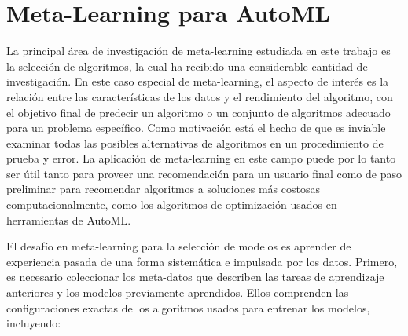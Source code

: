 %
%


\section{Meta-Learning para AutoML}\label{sec:metalearning-automl}


La principal área de investigación de meta-learning estudiada en este trabajo es la selección de algoritmos, la cual ha recibido una considerable cantidad de investigación. En este caso especial de meta-learning, el aspecto de interés es la relación entre las características de los datos y el rendimiento del algoritmo, con el objetivo final de predecir un algoritmo o un conjunto de algoritmos adecuado para un problema específico. Como motivación está el hecho de que es inviable examinar todas las posibles alternativas de algoritmos en un procedimiento de prueba y error. La aplicación de meta-learning en este campo puede por lo tanto ser útil tanto para proveer una recomendación para un usuario final como de paso preliminar para recomendar algoritmos a soluciones más costosas computacionalmente, como los algoritmos de optimización usados en herramientas de AutoML. 


El desafío en meta-learning para la selección de modelos es aprender de experiencia pasada de una forma sistemática e impulsada por los datos. Primero, es necesario coleccionar los meta-datos que describen las tareas de aprendizaje anteriores y los modelos previamente aprendidos. Ellos comprenden las configuraciones exactas de los algoritmos usados para entrenar los modelos, incluyendo:

